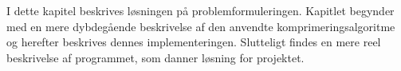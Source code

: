 I dette kapitel beskrives løsningen på problemformuleringen. Kapitlet begynder med en mere dybdegående beskrivelse af den anvendte komprimeringsalgoritme og herefter beskrives dennes implementeringen. Slutteligt findes en mere reel beskrivelse af programmet, som danner løsning for projektet. 